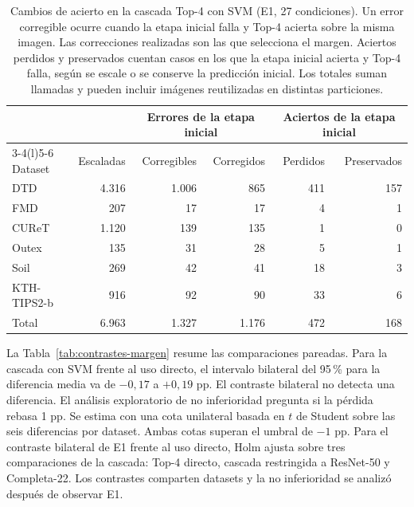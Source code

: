 \documentclass[a4paper,fleqn]{cas-sc}
\begin{document}
\begin{table}[pos=htbp]
\centering
\caption{Cambios de acierto en la cascada Top-4 con SVM (E1, 27 condiciones). Un error corregible ocurre cuando la etapa inicial falla y Top-4 acierta sobre la misma imagen. Las correcciones realizadas son las que selecciona el margen. Aciertos perdidos y preservados cuentan casos en los que la etapa inicial acierta y Top-4 falla, según se escale o se conserve la predicción inicial. Los totales suman llamadas y pueden incluir imágenes reutilizadas en distintas particiones.}
\label{tab:e1-cambios}
\small
\begin{tabular}{@{}lrrrrr@{}}
\toprule
 & & \multicolumn{2}{c}{Errores de la etapa inicial} & \multicolumn{2}{c}{Aciertos de la etapa inicial} \\
\cmidrule(lr){3-4}\cmidrule(l){5-6}
Dataset & Escaladas & Corregibles & Corregidos & Perdidos & Preservados \\
\midrule
DTD & 4.316 & 1.006 & 865 & 411 & 157 \\
FMD & 207 & 17 & 17 & 4 & 1 \\
CUReT & 1.120 & 139 & 135 & 1 & 0 \\
Outex & 135 & 31 & 28 & 5 & 1 \\
Soil & 269 & 42 & 41 & 18 & 3 \\
KTH-TIPS2-b & 916 & 92 & 90 & 33 & 6 \\
\midrule
Total & 6.963 & 1.327 & 1.176 & 472 & 168 \\
\bottomrule
\end{tabular}
\end{table}

La Tabla~\ref{tab:contrastes-margen} resume las comparaciones pareadas. Para la cascada con SVM frente al uso directo, el intervalo bilateral del 95\,\% para la diferencia media va de $-0{,}17$ a $+0{,}19$ pp. El contraste bilateral no detecta una diferencia. El análisis exploratorio de no inferioridad pregunta si la pérdida rebasa 1 pp. Se estima con una cota unilateral basada en $t$ de Student sobre las seis diferencias por dataset. Ambas cotas superan el umbral de $-1$ pp. Para el contraste bilateral de E1 frente al uso directo, Holm ajusta sobre tres comparaciones de la cascada: Top-4 directo, cascada restringida a ResNet-50 y Completa-22. Los contrastes comparten datasets y la no inferioridad se analizó después de observar E1.
\end{document}

